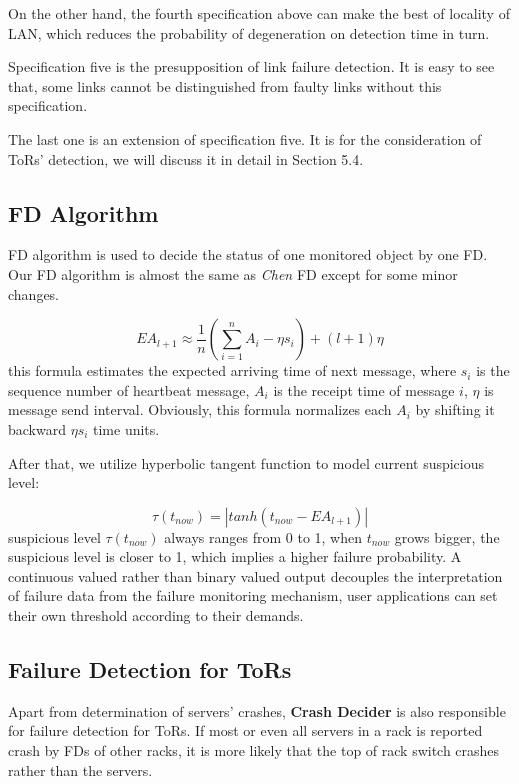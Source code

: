 \documentclass{sig-alternate-05-2015}
\begin{document}
On the other hand, the fourth specification above can make the best of locality of LAN, which reduces the probability of degeneration on detection time in turn.

Specification five is the presupposition of link failure detection. It is easy to see that, some links cannot be distinguished from faulty links without this specification.

The last one is an extension of specification five. It is for the consideration of ToRs' detection, we will discuss it in detail in Section 5.4.

\subsection{FD Algorithm}
FD algorithm is used to decide the status of one monitored object by one FD. Our FD algorithm is almost the same as \textit{Chen} FD \cite{chen2002quality} except for some minor changes.

\begin{equation}
EA_{l+1} \approx \frac{1}{n}(\sum_{i=1}^{n}A_i - \eta s_i)+(l+1)\eta
\end{equation}
this formula estimates the expected arriving time of next message, where $s_i$ is the sequence number of heartbeat message, $A_i$ is the receipt time of message $i$, $\eta$ is message send interval. Obviously, this formula normalizes each $A_i$ by shifting it backward $\eta s_i$ time units.

After that, we utilize hyperbolic tangent function to model current suspicious level:

\begin{equation}
\tau(t_{now}) = |tanh(t_{now}-EA_{l+1})|
\end{equation}
suspicious level $\tau(t_{now})$ always ranges from 0 to 1, when $t_{now}$ grows bigger, the suspicious level is closer to 1, which implies a higher failure probability. A continuous valued rather than binary valued output decouples the interpretation of failure data from the failure monitoring mechanism, user applications can set their own threshold according to their demands.

\subsection{Failure Detection for ToRs}
Apart from determination of servers' crashes, \textbf{Crash Decider} is also responsible for failure detection for ToRs. If most or even all servers in a rack is reported crash by FDs of other racks, it is more likely that the top of rack switch crashes rather than the servers.
\end{document}

